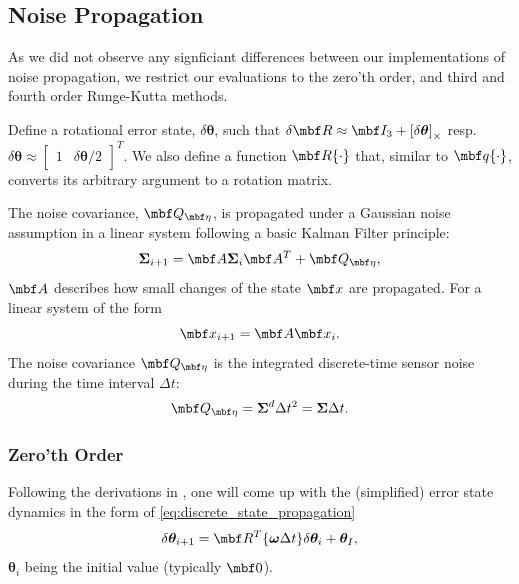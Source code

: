 \documentclass[10pt,a4paper]{article}
\newcommand{\mbs}[1]{{\boldsymbol{#1}}}
\numberwithin{equation}{section}
\begin{document}
\subsection{Noise Propagation}
As we did not observe any signficiant differences between our implementations of noise propagation, we restrict our evaluations to the zero'th order, and third and fourth order Runge-Kutta methods. 

Define a rotational error state, $\delta \mbs \theta$, such that $\delta \mbf R \approx \mbf I_3 + \left[ \delta \mbs \theta \right]_\times$ resp. $\delta \mbs \theta \approx \begin{bmatrix}
1 & \delta \mbs \theta / 2
\end{bmatrix}^T$. We also define a function $\mbf R \lbrace \cdot \rbrace$ that, similar to $\mbf q \lbrace \cdot \rbrace$, converts its arbitrary argument to a rotation matrix.

The noise covariance, $\mbf Q_{\mbf \eta}$, is propagated under a Gaussian noise assumption in a linear system following a basic Kalman Filter principle:
\begin{equation}
\mbs \Sigma_{i+1} = \mbf A \mbs \Sigma_i \mbf A^T + \mbf Q_{\mbf \eta},
\end{equation}
$\mbf A$ describes how small changes of the state $\mbf x$ are propagated. For a linear system of the form 
\begin{equation}
\mbf x_{i+1} = \mbf A \mbf x_i.
\label{eq:discrete_state_propagation}
\end{equation}
The noise covariance $\mbf Q_{\mbf \eta}$ is the integrated discrete-time sensor noise during the time interval $\Delta t$:
\begin{equation}
\mbf Q_{\mbf \eta} = \mbs \Sigma^d \Delta t^2 = \mbs \Sigma \Delta t.
\label{eq:integrated_noise_covariance}
\end{equation}

\subsubsection{Zero'th Order}
Following the derivations in \cite{joan_sola}, one will come up with the (simplified) error state dynamics in the form of \eqref{eq:discrete_state_propagation}
\begin{equation}
\delta \mbs \theta_{i+1} = \mbf R^T \lbrace \mbs \omega \Delta t \rbrace
\delta  \mbs \theta_i + \mbs \theta_I,
\end{equation}
$\mbs \theta_i$ being the initial value (typically $\mbf 0$).
\end{document}
